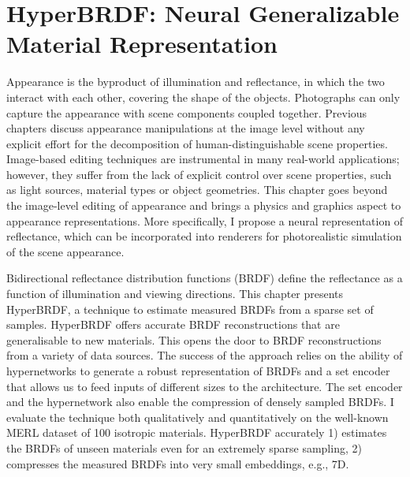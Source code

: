 \chapter{HyperBRDF: Neural Generalizable Material Representation}
\label{ch:HyperBRDF}

Appearance is the byproduct of illumination and reflectance, in which the two interact with each other, covering the shape of the objects. Photographs can only capture the appearance with scene components coupled together. Previous chapters discuss appearance manipulations at the image level without any explicit effort for the decomposition of human-distinguishable scene properties. Image-based editing techniques are instrumental in many real-world applications; however, they suffer from the lack of explicit control over scene properties, such as light sources, material types or object geometries. This chapter goes beyond the image-level editing of appearance and brings a physics and graphics aspect to appearance representations. More specifically, I propose a neural representation of reflectance, which can be incorporated into renderers for photorealistic simulation of the scene appearance.

Bidirectional reflectance distribution functions (\gls{BRDF}) define the reflectance as a function of illumination and viewing directions. This chapter presents HyperBRDF, a technique to estimate measured \gls{BRDF}s from a sparse set of samples. HyperBRDF offers accurate \gls{BRDF} reconstructions that are generalisable to new materials. This opens the door to \gls{BRDF} reconstructions from a variety of data sources. The success of the approach relies on the ability of hypernetworks to generate a robust representation of \gls{BRDF}s and a set encoder that allows us to feed inputs of different sizes to the architecture. The set encoder and the hypernetwork also enable the compression of densely sampled \gls{BRDF}s. I evaluate the technique both qualitatively and quantitatively on the well-known MERL dataset of 100 isotropic materials. HyperBRDF accurately 1) estimates the \gls{BRDF}s of unseen materials even for an extremely sparse sampling, 2) compresses the measured \gls{BRDF}s into very small embeddings, e.g., 7D. 








